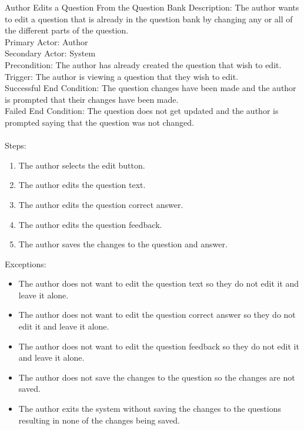     
    
    \begin{section}{Author Edits a Question From the Question Bank}
        Description: The author wants to edit a question that is already in the question bank by changing any or all of the different parts of the question. \\
        Primary Actor: Author \\
        Secondary Actor: System \\
        Precondition: The author has already created the question that wish to edit. \\
        Trigger: The author is viewing a question that they wish to edit. \\
        Successful End Condition: The question changes have been made and the author is prompted that their changes have been made. \\
        Failed End Condition: The question does not get updated and the author is prompted saying that the question was not changed. \\
        \\
        Steps:
        \begin{enumerate}
            \item{The author selects the edit button.}
            \item{The author edits the question text.}
            \item{The author edits the question correct answer.}
            \item{The author edits the question feedback.}
            \item{The author saves the changes to the question and answer.}
        \end{enumerate}
        Exceptions:
        \begin{itemize}
            \item{The author does not want to edit the question text so they do not edit it and leave it alone.}
            \item{The author does not want to edit the question correct answer so they do not edit it and leave it alone.}
            \item{The author does not want to edit the question feedback so they do not edit it and leave it alone.}
            \item{The author does not save the changes to the question so the changes are not saved.}
            \item{The author exits the system without saving the changes to the questions resulting in none of the changes being saved.}
        \end{itemize}
    \end{section}
    

